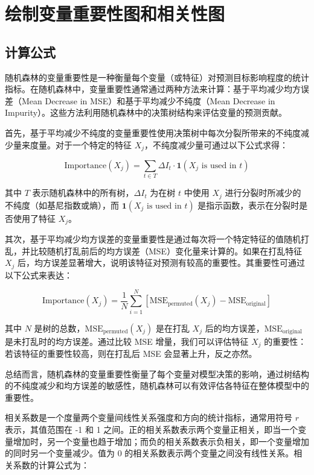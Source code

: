\documentclass[AutoFakeBold]{LZUThesis-PgD&PhD}
\begin{document}
	\section{绘制变量重要性图和相关性图}
	
	
	\subsection{计算公式}
	随机森林的变量重要性是一种衡量每个变量（或特征）对预测目标影响程度的统计指标。在随机森林中，变量重要性通常通过两种方法来计算：基于平均减少均方误差（Mean Decrease in MSE）和基于平均减少不纯度（Mean Decrease in Impurity）。这些方法利用随机森林中的决策树结构来评估变量的预测贡献。
	
	首先，基于平均减少不纯度的变量重要性使用决策树中每次分裂所带来的不纯度减少量来度量。对于一个特定的特征 \( X_j \)，不纯度减少量可通过以下公式求得：
	
	\[
	\text{Importance}(X_j) = \sum_{t \in T} \Delta I_t \cdot \mathbf{1}(X_j \text{ is used in } t)
	\]
	
	其中 \( T \) 表示随机森林中的所有树，\( \Delta I_t \) 为在树 \( t \) 中使用 \( X_j \) 进行分裂时所减少的不纯度（如基尼指数或熵），而 \( \mathbf{1}(X_j \text{ is used in } t) \) 是指示函数，表示在分裂时是否使用了特征 \( X_j \)。
	
	其次，基于平均减少均方误差的变量重要性是通过每次将一个特定特征的值随机打乱，并比较随机打乱前后的均方误差（MSE）变化量来计算的。如果在打乱特征 \( X_j \) 后，均方误差显著增大，说明该特征对预测有较高的重要性。其重要性可通过以下公式来表达：
	
	\[
	\text{Importance}(X_j) = \frac{1}{N} \sum_{i=1}^{N} \left[ \text{MSE}_{\text{permuted}}(X_j) - \text{MSE}_{\text{original}} \right]
	\]
	
	其中 \( N \) 是树的总数，\( \text{MSE}_{\text{permuted}}(X_j) \) 是在打乱 \( X_j \) 后的均方误差，\( \text{MSE}_{\text{original}} \) 是未打乱时的均方误差。通过比较 MSE 增量，我们可以评估特征 \( X_j \) 的重要性：若该特征的重要性较高，则在打乱后 MSE 会显著上升，反之亦然。
	
	总结而言，随机森林的变量重要性衡量了每个变量对模型决策的影响，通过树结构的不纯度减少和均方误差的敏感性，随机森林可以有效评估各特征在整体模型中的重要性。
	
	相关系数是一个度量两个变量间线性关系强度和方向的统计指标，通常用符号 \( r \) 表示，其值范围在 -1 和 1 之间。正的相关系数表示两个变量正相关，即当一个变量增加时，另一个变量也趋于增加；而负的相关系数表示负相关，即一个变量增加的同时另一个变量减少。值为 0 的相关系数表示两个变量之间没有线性关系。相关系数的计算公式为：
	
\end{document}

